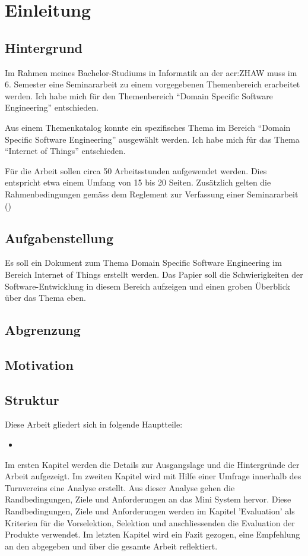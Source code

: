 
\chapter{Einleitung}

\section{Hintergrund}
Im Rahmen meines Bachelor-Studiums in Informatik an der \gls{acr:ZHAW} muss im 6. Semester eine Seminararbeit zu einem vorgegebenen Themenbereich erarbeitet werden. Ich habe mich für den Themenbereich "`Domain Specific Software Engineering"' entschieden.

Aus einem Themenkatalog konnte ein spezifisches Thema im Bereich "`Domain Specific Software Engineering"' ausgewählt werden. Ich habe mich für das Thema "`Internet of Things"' entschieden.

Für die Arbeit sollen circa 50 Arbeitsstunden aufgewendet werden. Dies entspricht etwa einem Umfang von 15 bis 20 Seiten. Zusätzlich gelten die Rahmenbedingungen gemäss dem Reglement zur Verfassung einer Seminararbeit (\cite{ZHAW:2012:Seminararbeit:Reglemente})

\section{Aufgabenstellung}
Es soll ein Dokument zum Thema Domain Specific Software Engineering im Bereich Internet of Things erstellt werden. Das Papier soll die Schwierigkeiten der Software-Entwicklung in diesem Bereich aufzeigen und einen groben Überblick über das Thema eben.

\section{Abgrenzung}

\section{Motivation}

\section{Struktur}
Diese Arbeit gliedert sich in folgende Hauptteile:
\begin{itemize}
\item 
\end{itemize}
Im ersten Kapitel werden die Details zur Ausgangslage und die Hintergründe der Arbeit aufgezeigt. Im zweiten Kapitel wird mit Hilfe einer Umfrage innerhalb des Turnvereins eine Analyse erstellt. Aus dieser Analyse gehen die Randbedingungen, Ziele und Anforderungen an das Mini  System hervor. Diese Randbedingungen, Ziele und Anforderungen werden im Kapitel 'Evaluation' als Kriterien für die Vorselektion, Selektion und anschliessenden die Evaluation der Produkte verwendet. Im letzten Kapitel wird ein Fazit gezogen, eine Empfehlung an den  abgegeben und über die gesamte Arbeit reflektiert.